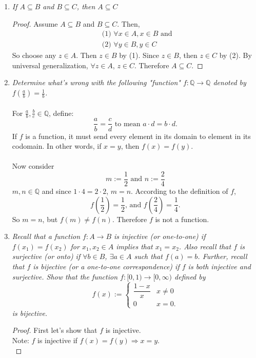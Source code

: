 \documentclass{amsart}
\begin{document}
\begin{enumerate}[1.]
\newpage

\item \emph{If $A\subseteq B$ and $B\subseteq C$, then $A\subseteq C$}
\begin{proof}
Assume $A\subseteq B$ and $B\subseteq C$. Then,
\begin{align*}
    &\text{(1) }\forall x\in A, x\in B \text{ and }\\
    &\text{(2) }\forall y\in B, y\in C
\end{align*}
So choose any $z\in A$. Then $z\in B$ by (1). Since $z\in B$, then
$z\in C$ by (2). By universal generalization, $\forall z\in A$,
$z\in C$. Therefore $A\subseteq C$.
\end{proof}

\newpage

\item \emph{Determine what's wrong with the following "function" 
$f:\mathbb{Q}\to \mathbb{Q}$ denoted by $f(\frac{a}{b})=\frac{1}{b}$.} \\\\
For $\frac{a}{b}, \frac{b}{c}\in \mathbb{Q}$, define:
\[
    \frac{a}{b} = \frac{c}{d} \text{ to mean } a\cdot d = b\cdot d.
\] 
If $f$ is a function, it must send every element in its domain to
 element in its codomain. In other words, if
$x=y$, then $f(x)=f(y)$.\\\\

Now consider
\[
    m := \frac{1}{2} \text{ and } n := \frac{2}{4}    
\]
$m, n\in\mathbb{Q}$ and since $1\cdot 4 = 2\cdot 2$, $m=n$. According
to the definition of $f$,
\[
    f\left(\frac{1}{2}\right) = \frac{1}{2} \text{, and }
    f\left(\frac{2}{4}\right) = \frac{1}{4}.
\]
So $m = n$, but $f(m)\neq f(n)$. Therefore $f$ is not a function.

\newpage

\item \emph{Recall that a function $f:A\to B$ is \emph{injective} (or one-to-one) if $f(x_1)=f(x_2)$ for $x_1,x_2\in A$ implies that $x_1=x_2$.  Also recall that $f$ is \emph{surjective} (or onto) if $\forall b\in B$, $\exists a\in A$ such that $f(a)=b$.  Further, recall that $f$ is \emph{bijective} (or a one-to-one correspondence) if $f$ is both injective and surjective. Show that the function $f:[0,1)\to [0,\infty)$ defined by
\[ 	f(x):= \begin{cases} \dfrac{1-x}{x} &  x\neq 0 \\
		                 0 & x=0. \end{cases} \]
is bijective.
}
\begin{proof} First let's show that $f$ is injective. \\
Note: $f$ is injective if $f(x) = f(y) \Rightarrow x = y$.\\


\end{proof}
\end{enumerate}
\end{document}

